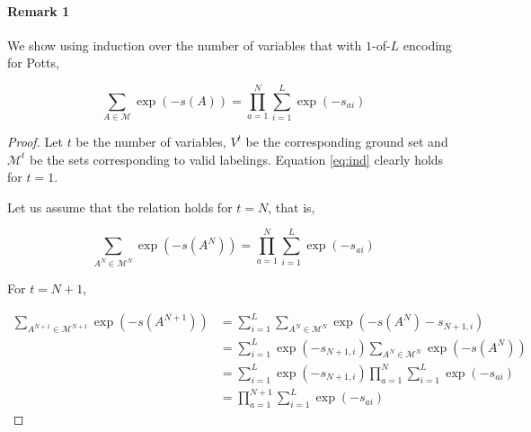 \appendix
{} 

\paragraph{Remark 1} We show using induction over the number of variables that with $1$-of-$L$ encoding for Potts, 

\begin{equation}
    \sum_{A \in {\mathcal M}} \exp(-s(A)) = \prod_{a = 1}^{N} \sum_{i = 1}^L \exp(-s_{ai})
    \label{eq:ind}
\end{equation}

\begin{proof}
Let $t$ be the number of variables, $V^t$ be the corresponding ground set and ${\mathcal M}^t$ be the sets corresponding to valid labelings. Equation \eqref{eq:ind} clearly holds for $t = 1$.

Let us assume that the relation holds for $t = N$, that is,

\begin{equation}
    \sum_{A^N \in {\mathcal M}^N} \exp(-s(A^N)) = \prod_{a = 1}^{N} \sum_{i = 1}^L \exp(-s_{ai})
\end{equation}

For $t = N + 1$, 

\begin{align}
    \sum_{A^{N + 1} \in {\mathcal M}^{N + 1}} \exp(-s(A^{N + 1})) &=  \sum_{i = 1}^L \sum_{A^N \in {\mathcal M}^{N}} \exp(-s(A^N) - s_{N+1, i}) \nonumber \\
                                                                  &= \sum_{i = 1}^L \exp(-s_{N+1, i}) \sum_{A^N \in {\mathcal M}^{N}} \exp(-s(A^N) ) \nonumber \\
                                                                  &= \sum_{i = 1}^L \exp(-s_{N+1, i}) \prod_{a = 1}^{N} \sum_{i = 1}^L \exp(-s_{ai}) \nonumber \\
                                                                  &= \prod_{a = 1}^{N + 1} \sum_{i = 1}^L \exp(-s_{ai})
\end{align}
\end{proof}
